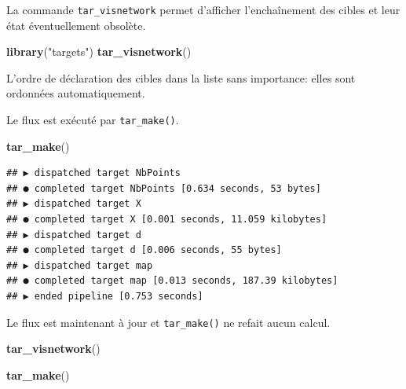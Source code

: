 \documentclass[
  12pt,
  french,
  a4paper,
  extrafontsizes,onecolumn,openright
  ]{memoir}
\newenvironment{Shaded}{\begin{snugshade}}{\end{snugshade}}
\newcommand{\FunctionTok}[1]{\textcolor[rgb]{0.13,0.29,0.53}{\textbf{#1}}}
\newcommand{\NormalTok}[1]{#1}
\newcommand{\StringTok}[1]{\textcolor[rgb]{0.31,0.60,0.02}{#1}}
\begin{document}
La commande \texttt{tar\_visnetwork} permet d'afficher l'enchaînement des cibles et leur état éventuellement obsolète.

\scriptsize

\begin{Shaded}
\begin{Highlighting}[]
\FunctionTok{library}\NormalTok{(}\StringTok{"targets"}\NormalTok{)}
\FunctionTok{tar\_visnetwork}\NormalTok{()}
\end{Highlighting}
\end{Shaded}

\normalsize

L'ordre de déclaration des cibles dans la liste sans importance: elles sont ordonnées automatiquement.

Le flux est exécuté par \texttt{tar\_make()}.

\scriptsize

\begin{Shaded}
\begin{Highlighting}[]
\FunctionTok{tar\_make}\NormalTok{()}
\end{Highlighting}
\end{Shaded}

\begin{verbatim}
## ▶ dispatched target NbPoints
## ● completed target NbPoints [0.634 seconds, 53 bytes]
## ▶ dispatched target X
## ● completed target X [0.001 seconds, 11.059 kilobytes]
## ▶ dispatched target d
## ● completed target d [0.006 seconds, 55 bytes]
## ▶ dispatched target map
## ● completed target map [0.013 seconds, 187.39 kilobytes]
## ▶ ended pipeline [0.753 seconds]
\end{verbatim}

\normalsize

Le flux est maintenant à jour et \texttt{tar\_make()} ne refait aucun calcul.

\scriptsize

\begin{Shaded}
\begin{Highlighting}[]
\FunctionTok{tar\_visnetwork}\NormalTok{()}
\end{Highlighting}
\end{Shaded}

\begin{Shaded}
\begin{Highlighting}[]
\FunctionTok{tar\_make}\NormalTok{()}
\end{Highlighting}
\end{Shaded}
\end{document}
